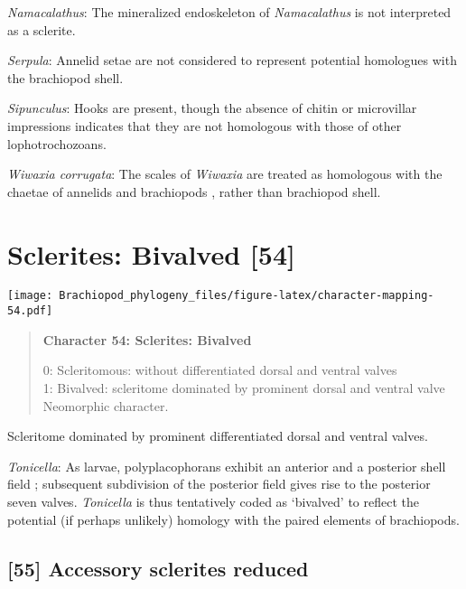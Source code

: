 \documentclass[openany]{book}
\theoremstyle{definition}
\theoremstyle{definition}
\theoremstyle{definition}
\theoremstyle{remark}
\begin{document}
\hypertarget{Namacalathus-coding-53}{}
\emph{Namacalathus}: The mineralized endoskeleton of \emph{Namacalathus}
is not interpreted as a sclerite.

\hypertarget{Serpula-coding-53}{}
\emph{Serpula}: Annelid setae are not considered to represent potential
homologues with the brachiopod shell.

\hypertarget{Sipunculus-coding-53}{}
\emph{Sipunculus}: Hooks are present, though the absence of chitin or
microvillar impressions indicates that they are not homologous with
those of other lophotrochozoans.

\hypertarget{Wiwaxia_corrugata-coding-53}{}
\emph{Wiwaxia corrugata}: The scales of \emph{Wiwaxia} are treated as
homologous with the chaetae of annelids and brachiopods
\citep{Butterfield1990, Smith2014, Zhang2015}, rather than brachiopod
shell.

\section{Sclerites: Bivalved {[}54{]}}\label{sclerites-bivalved-54}

\texttt{[image: Brachiopod\_phylogeny\_files/figure-latex/character-mapping-54.pdf]}

\begin{quote}
\textbf{Character 54: Sclerites: Bivalved}

0: Scleritomous: without differentiated dorsal and ventral valves\\
1: Bivalved: scleritome dominated by prominent dorsal and ventral
valve\\
Neomorphic character.
\end{quote}

Scleritome dominated by prominent differentiated dorsal and ventral
valves.

\hypertarget{Tonicella-coding-54}{}
\emph{Tonicella}: As larvae, polyplacophorans exhibit an anterior and a
posterior shell field \citep{Wanninger2002C}; subsequent subdivision of
the posterior field gives rise to the posterior seven valves.
\emph{Tonicella} is thus tentatively coded as `bivalved' to reflect the
potential (if perhaps unlikely) homology with the paired elements of
brachiopods.

\subsection*{{[}55{]} Accessory sclerites
reduced}\label{accessory-sclerites-reduced}
\end{document}
